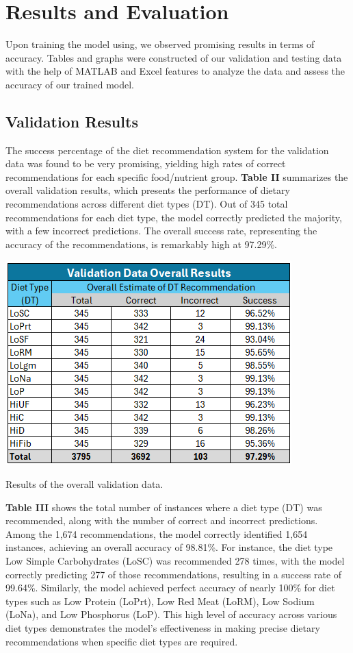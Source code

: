 \section{Results and Evaluation}
Upon training the model using, we observed promising results in terms of accuracy. Tables and graphs were constructed of our validation and testing data with the help of MATLAB and Excel features to analyze the data and assess the accuracy of our trained model.

\subsection{Validation Results}
The success percentage of the diet recommendation system for the validation data was found to be very promising, yielding high rates of correct recommendations for each specific food/nutrient group. \textbf{Table II} summarizes the overall validation results, which presents the performance of dietary recommendations across different diet types (DT). Out of 345 total recommendations for each diet type, the model correctly predicted the majority, with a few incorrect predictions. The overall success rate, representing the accuracy of the recommendations, is remarkably high at 97.29\%.

\begin{table}[H]
    \centering
    \includegraphics[width=\linewidth]{Figures/vdor.png}
    \caption{Results of the overall validation data.}
\end{table}

\textbf{Table III} shows the total number of instances where a diet type (DT) was recommended, along with the number of correct and incorrect predictions. Among the 1,674 recommendations, the model correctly identified 1,654 instances, achieving an overall accuracy of 98.81\%.
For instance, the diet type Low Simple Carbohydrates (LoSC) was recommended 278 times, with the model correctly predicting 277 of those recommendations, resulting in a success rate of 99.64\%. Similarly, the model achieved perfect accuracy of nearly 100\% for diet types such as Low Protein (LoPrt), Low Red Meat (LoRM), Low Sodium (LoNa), and Low Phosphorus (LoP). This high level of accuracy across various diet types demonstrates the model's effectiveness in making precise dietary recommendations when specific diet types are required.

